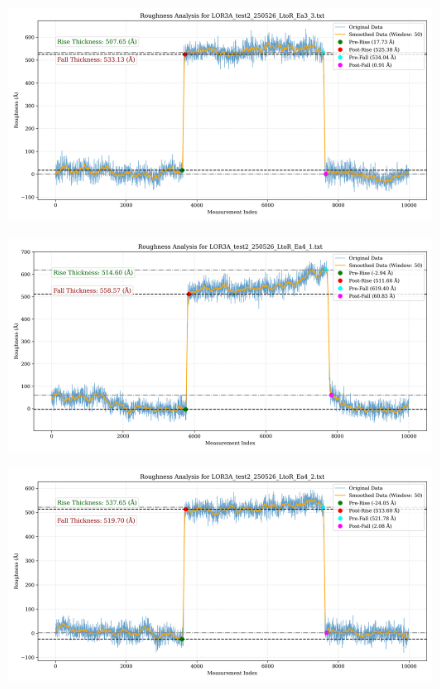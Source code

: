 \documentclass[platex,dvipdfmx,10pt,twoside,a4paper,jis2004]{jsarticle}
\begin{document}
\begin{figure}[H]
    \centering
    \includegraphics[width=\textwidth]{LOR3A_test2_250526_LtoR_Ea3_3.png}
    \label{fig:LOR3Atest2250526LtoREa33}
\end{figure}
\begin{figure}[H]
    \centering
    \includegraphics[width=\textwidth]{LOR3A_test2_250526_LtoR_Ea4_1.png}
    \label{fig:LOR3Atest2250526LtoREa41}
\end{figure}
\begin{figure}[H]
    \centering
    \includegraphics[width=\textwidth]{LOR3A_test2_250526_LtoR_Ea4_2.png}
    \label{fig:LOR3Atest2250526LtoREa42}
\end{figure}
\end{document}
